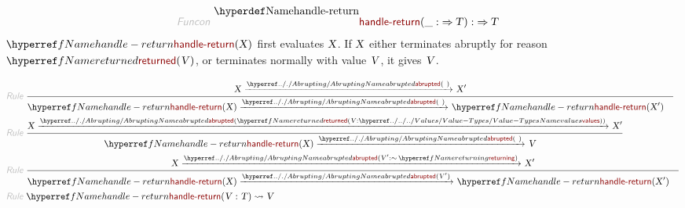 \begin{align*}
  \KEY{Funcon} ~ 
  & \NAMEDECL{handle-return}(\_ :  \TO \VAR{T}) :  \TO \VAR{T}
\end{align*}
$\SHADE{\NAMEREF{handle-return}
           ( \VAR{X} )}$ first evaluates $\SHADE{\VAR{X}}$. If $\SHADE{\VAR{X}}$ either terminates abruptly for 
  reason $\SHADE{\NAMEREF{returned}
           ( \VAR{V} )}$, or terminates normally with value $\SHADE{\VAR{V}}$, it gives $\SHADE{\VAR{V}}$.

\begin{align*}
  \KEY{Rule} ~ 
    & \RULE{
       \VAR{X} \xrightarrow{\NAMEHYPER{../.}{Abrupting}{abrupted}(  ~  )}_{} 
        \VAR{X}'
      }{
      &  \NAMEREF{handle-return}
                      ( \VAR{X} ) \xrightarrow{\NAMEHYPER{../.}{Abrupting}{abrupted}(  ~  )}_{} 
          \NAMEREF{handle-return}
            ( \VAR{X}' )
      }
\\
  \KEY{Rule} ~ 
    & \RULE{
       \VAR{X} \xrightarrow{\NAMEHYPER{../.}{Abrupting}{abrupted}( \NAMEREF{returned}
                                                                                                    ( \VAR{V} : \NAMEHYPER{../../../Values}{Value-Types}{values} ) )}_{} 
        \VAR{X}'
      }{
      &  \NAMEREF{handle-return}
                      ( \VAR{X} ) \xrightarrow{\NAMEHYPER{../.}{Abrupting}{abrupted}(  ~  )}_{} 
          \VAR{V}
      }
\\
  \KEY{Rule} ~ 
    & \RULE{
       \VAR{X} \xrightarrow{\NAMEHYPER{../.}{Abrupting}{abrupted}( \VAR{V}' : \mathop{\sim} \NAMEREF{returning} )}_{} 
        \VAR{X}'
      }{
      &  \NAMEREF{handle-return}
                      ( \VAR{X} ) \xrightarrow{\NAMEHYPER{../.}{Abrupting}{abrupted}( \VAR{V}' )}_{} 
          \NAMEREF{handle-return}
            ( \VAR{X}' )
      }
\\
  \KEY{Rule} ~ 
    & \NAMEREF{handle-return}
        ( \VAR{V} : \VAR{T} ) \leadsto
        \VAR{V}
\end{align*}
